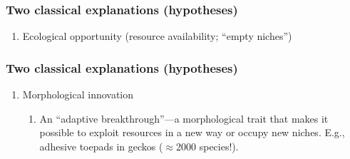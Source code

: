 \begin{frame}[t]
    \frametitle{Two classical explanations (hypotheses)}
    \begin{adjustwidth}{-2em}{-1.5em}

        \begin{enumerate}
            \item Ecological opportunity (resource availability; ``empty
                niches'')
        \end{enumerate}
    \end{adjustwidth}
\end{frame}

\begin{frame}[t]
    \frametitle{Two classical explanations (hypotheses)}
    \begin{adjustwidth}{-2em}{-1.5em}

        \begin{enumerate}
            \addtocounter{enumi}{1}

            \item Morphological innovation

            \begin{enumerate}

                \item An ``adaptive breakthrough''---a morphological trait that
                    makes it possible to exploit resources in a new way or
                    occupy new niches. E.g., adhesive toepads in geckos
                    ($\approx$2000 species!).

            \end{enumerate}
        \end{enumerate}
    \end{adjustwidth}
\end{frame}

